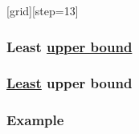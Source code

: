 \documentclass[aspectratio=169]{beamer}
\begin{document}
{
[grid][step=13]

\begin{frame}
\frametitle{Least \underline{upper bound}}
\end{frame}

\begin{frame}
\frametitle{\underline{Least} upper bound}
\end{frame}

\begin{frame}[t]
\frametitle{Example}

\end{frame}

}
\end{document}
